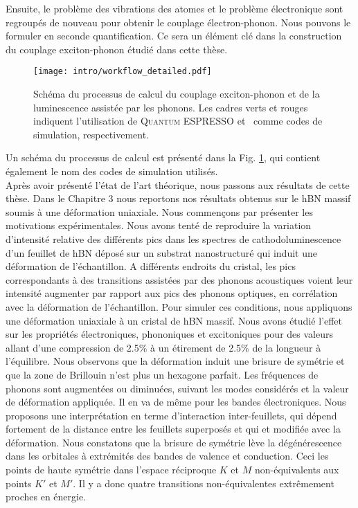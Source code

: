 Ensuite, le problème des vibrations des atomes et le problème électronique sont regroupés de nouveau pour obtenir le couplage électron-phonon. Nous pouvons le formuler en seconde quantification. Ce sera un élément clé dans la construction du couplage exciton-phonon étudié dans cette thèse. 
\begin{figure}[H]
	\vspace{0.2cm}
	\setcapindent{2em}
	\centering
	\texttt{[image: intro/workflow\_detailed.pdf]}
	\caption{\footnotesize{Schéma du processus de calcul du couplage exciton-phonon et de la luminescence assistée par les phonons. Les cadres verts et rouges indiquent l'utilisation de \textsc{Quantum ESPRESSO} et \yambo~comme codes de simulation, respectivement.}}
	\label{fig:workflow_fr}
\end{figure}
Un schéma du processus de calcul est présenté dans la Fig. \ref{fig:workflow_fr}, qui contient également le nom des codes de simulation utilisés.\\


%
%
Après avoir présenté l'état de l'art théorique, nous passons aux résultats de cette thèse. Dans le Chapitre 3 nous reportons nos résultats obtenus sur le hBN massif soumis à une déformation uniaxiale. Nous commençons par présenter les motivations expérimentales. Nous avons tenté de reproduire la variation d'intensité relative des différents pics dans les spectres de cathodoluminescence d'un feuillet de hBN déposé sur un substrat nanostructuré qui induit une déformation de l'échantillon. A différents endroits du cristal, les pics correspondants à des transitions assistées par des phonons acoustiques voient leur intensité augmenter par rapport aux pics des phonons optiques, en corrélation avec la déformation de l'échantillon. Pour simuler ces conditions, nous appliquons une déformation uniaxiale à un cristal de hBN massif. Nous avons étudié l'effet sur les propriétés électroniques, phononiques et excitoniques pour des valeurs allant d'une compression de 2.5\% à un étirement de 2.5\% de la longueur à l'équilibre.
Nous observons que la déformation induit une brisure de symétrie et que la zone de Brillouin n'est plus un hexagone parfait. Les fréquences de phonons sont augmentées ou diminuées, suivant les modes considérés et la valeur de déformation appliquée. Il en va de même pour les bandes électroniques. Nous proposons une interprétation en terme d'interaction inter-feuillets, qui dépend fortement de la distance entre les feuillets superposés et qui et modifiée avec la déformation. Nous constatons que la brisure de symétrie lève la dégénérescence dans les orbitales à extrémités des bandes de valence et conduction. Ceci les points de haute symétrie dans l'espace réciproque $K$ et $M$ non-équivalents aux points $K'$ et $M'$. Il y a donc quatre transitions non-équivalentes extrêmement proches en énergie. 

